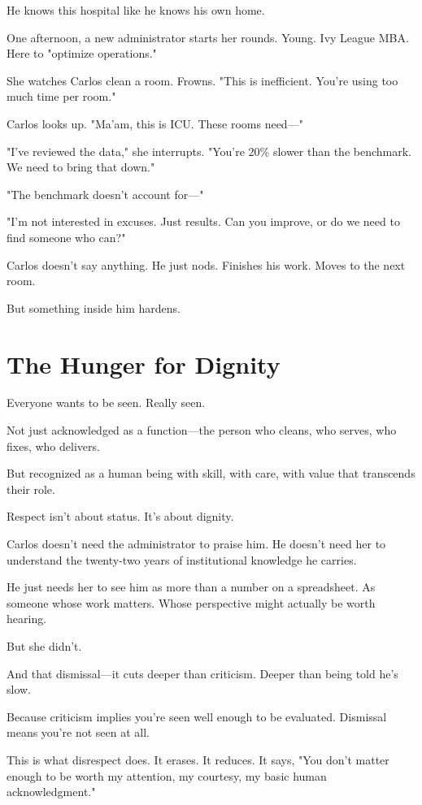 \documentclass[11pt,twoside]{book}
\begin{document}
He knows this hospital like he knows his own home.

One afternoon, a new administrator starts her rounds. Young. Ivy League MBA. Here to "optimize operations."

She watches Carlos clean a room. Frowns. "This is inefficient. You're using too much time per room."

Carlos looks up. "Ma'am, this is ICU. These rooms need—"

"I've reviewed the data," she interrupts. "You're 20\% slower than the benchmark. We need to bring that down."

"The benchmark doesn't account for—"

"I'm not interested in excuses. Just results. Can you improve, or do we need to find someone who can?"

Carlos doesn't say anything. He just nods. Finishes his work. Moves to the next room.

But something inside him hardens.

\section*{The Hunger for Dignity}

Everyone wants to be seen. Really seen.

Not just acknowledged as a function—the person who cleans, who serves, who fixes, who delivers.

But recognized as a human being with skill, with care, with value that transcends their role.

Respect isn't about status. It's about dignity.

Carlos doesn't need the administrator to praise him. He doesn't need her to understand the twenty-two years of institutional knowledge he carries.

He just needs her to see him as more than a number on a spreadsheet. As someone whose work matters. Whose perspective might actually be worth hearing.

But she didn't.

And that dismissal—it cuts deeper than criticism. Deeper than being told he's slow.

Because criticism implies you're seen well enough to be evaluated. Dismissal means you're not seen at all.

This is what disrespect does. It erases. It reduces. It says, "You don't matter enough to be worth my attention, my courtesy, my basic human acknowledgment."
\end{document}
